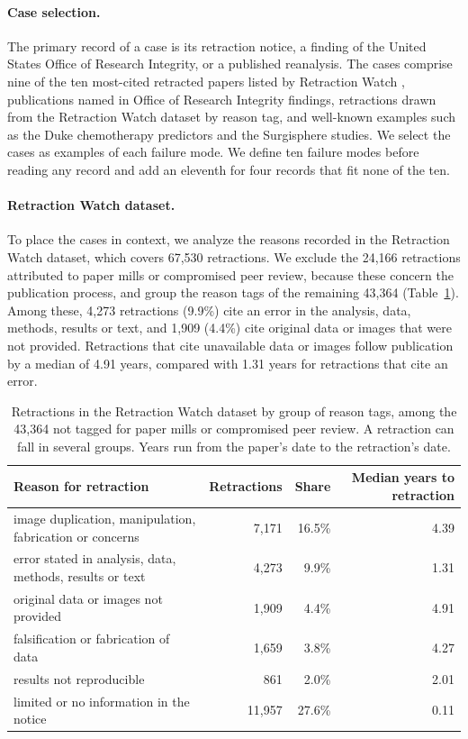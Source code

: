 \paragraph{Case selection.} The primary record of a case is its retraction notice, a finding of
the United States Office of Research Integrity, or a published reanalysis. The cases comprise
nine of the ten most-cited retracted papers listed by Retraction Watch
\citep{retractionwatch2026leaderboard}, publications named in Office of Research
Integrity findings, retractions drawn from the Retraction Watch dataset
\citep{crossref2026retractionwatchdata} by reason tag, and well-known examples such as
the Duke chemotherapy predictors and the Surgisphere studies. We select the cases as examples
of each failure mode. We define ten failure modes before reading any record and add an
eleventh for four records that fit none of the ten.

\paragraph{Retraction Watch dataset.} To place the cases in context, we analyze the reasons
recorded in the Retraction Watch dataset, which covers 67,530 retractions. We exclude the
24,166 retractions attributed to paper mills or compromised peer review, because these concern
the publication process, and group the reason tags of the remaining 43,364
(Table~\ref{tab:fc-dataset}). Among these, 4,273 retractions (9.9\%) cite an error in the
analysis, data, methods, results or text, and 1,909 (4.4\%) cite original data or images that
were not provided. Retractions that cite unavailable data or images follow publication by a
median of 4.91 years, compared with 1.31 years for retractions that cite an error.

\vspace{0.5em}
\begin{table}[h]
\centering
\small
\caption{Retractions in the Retraction Watch dataset by group of reason tags, among the 43,364
not tagged for paper mills or compromised peer review. A retraction can fall in several groups.
Years run from the paper's date to the retraction's date.}
\label{tab:fc-dataset}
\begin{tabular}{@{}>{\raggedright\arraybackslash}p{}rrr@{}}
\toprule
\textbf{Reason for retraction} & \textbf{Retractions} & \textbf{Share} & \textbf{Median years to retraction} \\
\midrule
image duplication, manipulation, fabrication or concerns & 7,171 & 16.5\% & 4.39 \\
error stated in analysis, data, methods, results or text & 4,273 & 9.9\% & 1.31 \\
original data or images not provided & 1,909 & 4.4\% & 4.91 \\
falsification or fabrication of data & 1,659 & 3.8\% & 4.27 \\
results not reproducible & 861 & 2.0\% & 2.01 \\
limited or no information in the notice & 11,957 & 27.6\% & 0.11 \\
\bottomrule
\end{tabular}
\end{table}


